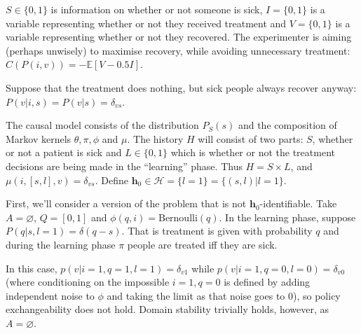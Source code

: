 \begin{example}
$S\in \{0,1\}$ is information on whether or not someone is sick, $I=\{0,1\}$ is a variable representing whether or not they received treatment and $V=\{0,1\}$ is a variable representing whether or not they recovered. The experimenter is aiming (perhaps unwisely) to maximise recovery, while avoiding unnecessary treatment: $C(P(i,v))=-\mathbb{E}[V-0.5I]$. 

Suppose that the treatment does nothing, but sick people always recover anyway: $P(v|i,s) = P(v|s) = \delta_{vs}$.

The causal model consists of the distribution $P_S(s)$ and the composition of Markov kernels $\theta,\pi,\phi$ and $\mu$. The history $H$ will consist of two parts: $S$, whether or not a patient is sick and $L\in\{0,1\}$ which is whether or not the treatment decisions are being made in the ``learning'' phase. Thus $H=S\times L$, and $\mu(i,[s,l],v)=\delta_{vs}$. Define $\mathbf{h}_0\in\mathcal{H}=\{l=1\}=\{(s,l)|l=1\}$.

First, we'll consider a version of the problem that is not $\mathbf{h}_0$-identifiable. Take $A=\varnothing$, $Q=[0,1]$ and $\phi(q,i)=\text{Bernoulli}(q)$. In the learning phase, suppose $P(q|s,l=1)=\delta(q-s)$. That is treatment is given with probability $q$ and during the learning phase $\pi$ people are treated iff they are sick.

In this case, $p(v|i=1,q=1,l=1)=\delta_{v1}$ while $p(v|i=1,q=0,l=0)=\delta_{v0}$ (where conditioning on the impossible $i=1,q=0$ is defined by adding independent noise to $\phi$ and taking the limit as that noise goes to 0), so policy exchangeability does not hold. Domain stability trivially holds, however, as $A=\varnothing$.









\end{example}

